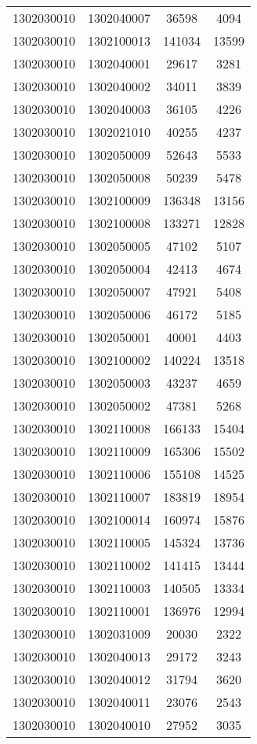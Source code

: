 \begin{longtable}{llcc}
1302030010 & 1302040007 & 36598 & 4094\\
1302030010 & 1302100013 & 141034 & 13599\\
1302030010 & 1302040001 & 29617 & 3281\\
1302030010 & 1302040002 & 34011 & 3839\\
1302030010 & 1302040003 & 36105 & 4226\\
1302030010 & 1302021010 & 40255 & 4237\\
1302030010 & 1302050009 & 52643 & 5533\\
1302030010 & 1302050008 & 50239 & 5478\\
1302030010 & 1302100009 & 136348 & 13156\\
1302030010 & 1302100008 & 133271 & 12828\\
1302030010 & 1302050005 & 47102 & 5107\\
1302030010 & 1302050004 & 42413 & 4674\\
1302030010 & 1302050007 & 47921 & 5408\\
1302030010 & 1302050006 & 46172 & 5185\\
1302030010 & 1302050001 & 40001 & 4403\\
1302030010 & 1302100002 & 140224 & 13518\\
1302030010 & 1302050003 & 43237 & 4659\\
1302030010 & 1302050002 & 47381 & 5268\\
1302030010 & 1302110008 & 166133 & 15404\\
1302030010 & 1302110009 & 165306 & 15502\\
1302030010 & 1302110006 & 155108 & 14525\\
1302030010 & 1302110007 & 183819 & 18954\\
1302030010 & 1302100014 & 160974 & 15876\\
1302030010 & 1302110005 & 145324 & 13736\\
1302030010 & 1302110002 & 141415 & 13444\\
1302030010 & 1302110003 & 140505 & 13334\\
1302030010 & 1302110001 & 136976 & 12994\\
1302030010 & 1302031009 & 20030 & 2322\\
1302030010 & 1302040013 & 29172 & 3243\\
1302030010 & 1302040012 & 31794 & 3620\\
1302030010 & 1302040011 & 23076 & 2543\\
1302030010 & 1302040010 & 27952 & 3035\\

\end{longtable}
